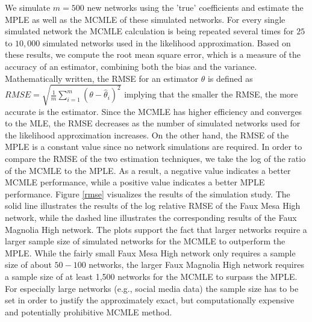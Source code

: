 \documentclass[10pt, conference, compsocconf]{IEEEtran}
\begin{document}
\indent We simulate $m=500$ new networks using the 'true' coefficients and estimate the MPLE as well as the MCMLE of these simulated networks. For every single simulated network the MCMLE calculation is being repeated several times for $25$ to $10,000$ simulated networks used in the likelihood approximation.
Based on these results, we compute the root mean square error, which is a measure of the accuracy of an estimator, combining both the bias and the variance. Mathematically written, the RMSE for an estimator $\hat{\theta}$ is defined as 
$RMSE = \sqrt{\frac{1}{m}\sum_{i=1}^{m}(\theta - \hat{\theta}_i)^2}$
implying that the smaller the RMSE, the more accurate is the estimator. Since the MCMLE has higher efficiency and converges to the MLE, the RMSE decreases as the number of simulated networks used for the likelihood approximation increases. On the other hand, the RMSE of the MPLE is a constant value since no network simulations are required. In order to compare the RMSE of the two estimation techniques, we take the log of the ratio of the MCMLE to the MPLE. As a result, a negative value indicates a better MCMLE performance, while a positive value indicates a better MPLE performance.
\indent Figure \ref{rmse} visualizes the results of the simulation study. The solid line illustrates the results of the log relative RMSE of the Faux Mesa High network, while the dashed line illustrates the corresponding results of the Faux Magnolia High network. 
The plots support the fact that larger networks require a larger sample size of simulated networks for the MCMLE to outperform the MPLE. While the fairly small Faux Mesa High network only requires a sample size of about $50-100$ networks, the larger Faux Magnolia High network requires a sample size of at least 1,500 networks for the MCMLE to surpass the MPLE.  For especially large networks (e.g., social media data) the sample size has to be set in order to justify the approximately exact, but computationally expensive and potentially prohibitive MCMLE method.
\end{document}
